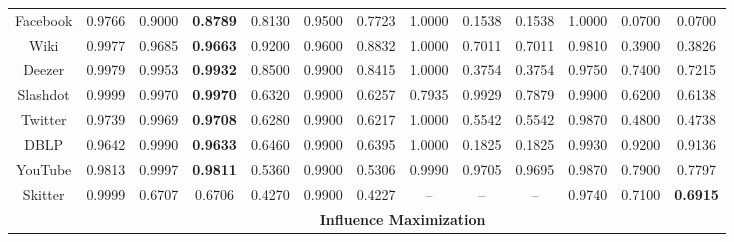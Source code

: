 \documentclass[letterpaper]{article} %
\begin{document}
\begin{table}[h]
{\begin{tabular}{|ccccccccccccc|}
\multicolumn{1}{|c||}{Facebook}& 0.9766& 0.9000& \multicolumn{1}{c||}{\textbf{0.8789}}& 0.8130& 0.9500& \multicolumn{1}{c||}{0.7723}& 1.0000& 0.1538& \multicolumn{1}{c||}{0.1538}& 1.0000& 0.0700& \multicolumn{1}{c|}{0.0700}\\
\multicolumn{1}{|c||}{Wiki}& 0.9977& 0.9685& \multicolumn{1}{c||}{\textbf{0.9663}}& 0.9200& 0.9600& \multicolumn{1}{c||}{0.8832}& 1.0000& 0.7011& \multicolumn{1}{c||}{0.7011}& 0.9810& 0.3900& \multicolumn{1}{c|}{0.3826}\\
\multicolumn{1}{|c||}{Deezer}& 0.9979& 0.9953& \multicolumn{1}{c||}{\textbf{0.9932}}& 0.8500& 0.9900& \multicolumn{1}{c||}{0.8415}& 1.0000& 0.3754& \multicolumn{1}{c||}{0.3754}& 0.9750& 0.7400& \multicolumn{1}{c|}{0.7215}\\
\multicolumn{1}{|c||}{Slashdot}& 0.9999& 0.9970& \multicolumn{1}{c||}{\textbf{0.9970}}& 0.6320& 0.9900& \multicolumn{1}{c||}{0.6257}& 0.7935& 0.9929& \multicolumn{1}{c||}{0.7879}& 0.9900& 0.6200& \multicolumn{1}{c|}{0.6138}\\
\multicolumn{1}{|c||}{Twitter}& 0.9739& 0.9969& \multicolumn{1}{c||}{\textbf{0.9708}}& 0.6280& 0.9900& \multicolumn{1}{c||}{0.6217}& 1.0000& 0.5542& \multicolumn{1}{c||}{0.5542}& 0.9870& 0.4800& \multicolumn{1}{c|}{0.4738}\\
\multicolumn{1}{|c||}{DBLP}& 0.9642& 0.9990& \multicolumn{1}{c||}{\textbf{0.9633}}& 0.6460& 0.9900& \multicolumn{1}{c||}{0.6395}& 1.0000& 0.1825& \multicolumn{1}{c||}{0.1825}& 0.9930& 0.9200& \multicolumn{1}{c|}{0.9136}\\
\multicolumn{1}{|c||}{YouTube}& 0.9813& 0.9997& \multicolumn{1}{c||}{\textbf{0.9811}}& 0.5360& 0.9900& \multicolumn{1}{c||}{0.5306}& 0.9990& 0.9705& \multicolumn{1}{c||}{0.9695}& 0.9870& 0.7900& \multicolumn{1}{c|}{0.7797}\\
\multicolumn{1}{|c||}{Skitter}& 0.9999 &  0.6707& \multicolumn{1}{c||}{0.6706}& 0.4270& 0.9900& \multicolumn{1}{c||}{0.4227}& --& --& \multicolumn{1}{c||}{--}& 0.9740& 0.7100& \multicolumn{1}{c|}{\textbf{0.6915}}\\
\hline
& \multicolumn{12}{c|}{\textbf{Influence Maximization}} \\ \hline


\end{tabular}}
\end{table}
\end{document}
